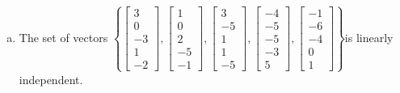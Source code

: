 \begin{exerciseAnswer}
\begin{enumerate}[(a)]
\item  The set of vectors \( \left\{ \left[\begin{array}{c}
3 \\
0 \\
-3 \\
1 \\
-2
\end{array}\right] , \left[\begin{array}{c}
1 \\
0 \\
2 \\
-5 \\
-1
\end{array}\right] , \left[\begin{array}{c}
3 \\
-5 \\
1 \\
1 \\
-5
\end{array}\right] , \left[\begin{array}{c}
-4 \\
-5 \\
-5 \\
-3 \\
5
\end{array}\right] , \left[\begin{array}{c}
-1 \\
-6 \\
-4 \\
0 \\
1
\end{array}\right] \right\} \)is linearly independent.
\end{enumerate}
    
\end{exerciseAnswer}
    
